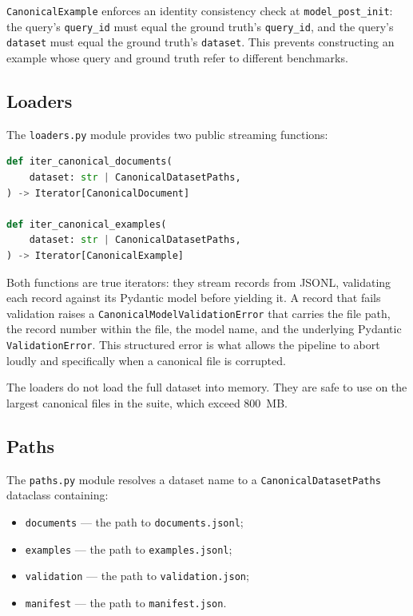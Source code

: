 \documentclass[11pt,a4paper]{article}
\begin{document}
\texttt{CanonicalExample} enforces an identity consistency check at
\texttt{model\_post\_init}: the query's \texttt{query\_id} must equal
the ground truth's \texttt{query\_id}, and the query's
\texttt{dataset} must equal the ground truth's \texttt{dataset}. This
prevents constructing an example whose query and ground truth refer
to different benchmarks.

\subsection{Loaders}
The \texttt{loaders.py} module provides two public streaming
functions:

\begin{lstlisting}[language=python]
def iter_canonical_documents(
    dataset: str | CanonicalDatasetPaths,
) -> Iterator[CanonicalDocument]

def iter_canonical_examples(
    dataset: str | CanonicalDatasetPaths,
) -> Iterator[CanonicalExample]
\end{lstlisting}

Both functions are true iterators: they stream records from JSONL,
validating each record against its Pydantic model before yielding it.
A record that fails validation raises a
\texttt{CanonicalModelValidationError} that carries the file path,
the record number within the file, the model name, and the underlying
Pydantic \texttt{ValidationError}. This structured error is what
allows the pipeline to abort loudly and specifically when a canonical
file is corrupted.

The loaders do not load the full dataset into memory. They are safe
to use on the largest canonical files in the suite, which exceed
\SI{800}{MB}.

\subsection{Paths}
The \texttt{paths.py} module resolves a dataset name to a
\texttt{CanonicalDatasetPaths} dataclass containing:

\begin{itemize}[leftmargin=1.5em,itemsep=0.15em]
  \item \texttt{documents} --- the path to \texttt{documents.jsonl};
  \item \texttt{examples} --- the path to \texttt{examples.jsonl};
  \item \texttt{validation} --- the path to \texttt{validation.json};
  \item \texttt{manifest} --- the path to \texttt{manifest.json}.
\end{itemize}
\end{document}
